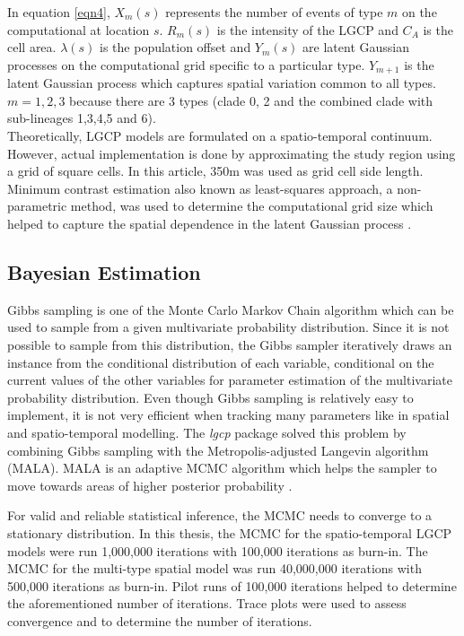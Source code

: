 In equation \ref{eqn4}, $X_m(s)$ represents the number of events of type $m$ on the computational at location $s$. $R_m(s)$ is the intensity of the LGCP and $C_A$ is the cell area. $\lambda(s)$ is the population offset and $Y_m(s)$ are latent Gaussian processes on the computational grid specific to a particular type. $Y_{m+1}$ is the latent Gaussian process which captures spatial variation common to all types. $m=1,2,3$ because there are 3 types (clade 0, 2 and the combined clade with sub-lineages 1,3,4,5 and 6).\\

Theoretically, LGCP models are formulated on a spatio-temporal continuum. However, actual implementation is done by approximating the study region using a grid of square cells. In this article, 350m was used as grid cell side length. Minimum contrast estimation also known as least-squares approach, a non-parametric method, was used to determine the computational grid size which helped to capture the spatial dependence in the latent Gaussian process \citep{Moller:1998, Davies:2013}.

\subsection{Bayesian Estimation}

Gibbs sampling is one of the Monte Carlo Markov Chain algorithm which can be used to sample from a given multivariate probability distribution. Since it is not possible to sample from this distribution, the Gibbs sampler iteratively draws an instance from the conditional distribution of each variable, conditional on the current values of the other variables for parameter estimation of the multivariate probability distribution. Even though Gibbs sampling is relatively easy to implement, it is not very efficient when tracking many parameters like in spatial and spatio-temporal modelling. The \textit{lgcp} package solved this problem by combining Gibbs sampling with the Metropolis-adjusted Langevin algorithm (MALA). MALA is an adaptive MCMC algorithm which helps the sampler to move towards areas of higher posterior probability \citep{Taylor:2013}.

For valid and reliable statistical inference, the MCMC needs to converge to a stationary distribution. In this thesis, the MCMC for the spatio-temporal LGCP models were run 1,000,000 iterations with 100,000 iterations as burn-in. The MCMC for the multi-type spatial model was run 40,000,000 iterations with 500,000 iterations as burn-in. Pilot runs of 100,000 iterations helped to determine the aforementioned number of iterations. Trace plots were used to assess convergence and to determine the number of iterations.

